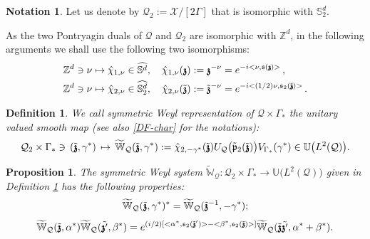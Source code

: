 \documentclass[12pt]{article}
\newtheorem{definition}[theorem]{Definition}
\newtheorem{proposition}[theorem]{Proposition}
\theoremstyle{definition}
\newtheorem{notation}[theorem]{Notation}
\def\Zd{\mathbb{Z}^d}
\def\X{\mathcal X}
\def\T{\mathcal{Q}}
\def\p{\mathfrak{p}}
\def\s{\mathfrak{s}}
\def\bz{\mathfrak{z}\hspace*{-4pt}\mathfrak{z}}
\def\beq{\begin{equation}}
\def\eeq{\end{equation}}
\def\Sd{\mathbb{S}^d}
\numberwithin{equation}{section}
\begin{document}
\begin{notation}
Let us denote by $\T_2:=\X/[2\Gamma]$ that is  isomorphic with $\Sd_2$.
\end{notation}
As the two Pontryagin duals of $\T$ and $\T_2$ are isomorphic with $\Zd$, in the following arguments we shall use the following two isomorphisms:
\beq\label{DF-char}\begin{split}
	&\Zd\ni\nu\mapsto\hat{\chi}_{1,\nu}\in\widehat{\Sd},\quad\hat{\chi}_{1,\nu}(\bz):=\bz^{-\nu}=e^{-i<\nu,\s(\bz)>}\,,\\
	&\Zd\ni\nu\mapsto\hat{\chi}_{2,\nu}\in\widehat{\Sd_2},\quad\hat{\chi}_{2,\nu}(\tilde{\bz}):=\tilde{\bz}^{-\nu}=e^{-i<(1/2)\nu,\s_2(\tilde{\bz})>}\,.
\end{split}\eeq

\begin{definition}\label{D-s-tor-W-syst}
We call   \emph{symmetric Weyl representation of  $\T\times\Gamma_*$} the unitary valued smooth map (see also \eqref{DF-char} for the notations):
	\beq\label{DF-s-tor-W-syst}
	 \T_2\times\Gamma_*\ni\,(\tilde{\bz},\gamma^*)\,\mapsto\,\widetilde{\mathbb{W}}_{\T}(\tilde{\bz},\gamma^*):=\hat{\chi}_{2,-\gamma^*}(\tilde{\bz})U_{\T}\big(\tilde{\p}_2(\tilde{\bz})\big)V_{\Gamma_*}(\gamma^*)\in\mathbb{U}\big(L^2(\T)\big).
	\eeq
\end{definition}
\begin{proposition}
The symmetric Weyl system { $\widetilde{\mathbb{W}}_{\T}:\T_2\times\Gamma_*\rightarrow\mathbb{U}\big(L^2(\T)\big)$ given in Definition \ref{D-s-tor-W-syst}} has the following properties:
\beq
\widetilde{\mathbb{W}}_{\T}(\tilde{\bz},\gamma^*)^*=\widetilde{\mathbb{W}}_{\T}(\tilde{\bz}^{-1},-\gamma^*);
\eeq
\beq\label{F-comp-torWsyst}
\widetilde{\mathbb{W}}_{\T}(\tilde{\bz},\alpha^*)\widetilde{\mathbb{W}}_{\T}(\tilde{\bz'},\beta^*)=e^{(i/2)[<\alpha^*,\s_2(\tilde{\bz}')>-<\beta^*,\s_2(\tilde{\bz})>]}\widetilde{\mathbb{W}}_{\T}(\tilde{\bz}\tilde{\bz'},\alpha^*+\beta^*).
\eeq
\end{proposition}
\end{document}
